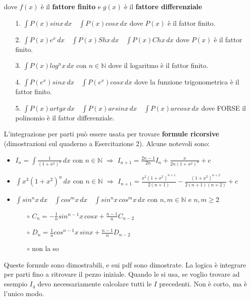 \documentclass{article}
\theoremstyle{definition}
\theoremstyle{definition}
\theoremstyle{definition}
\theoremstyle{definition}
\theoremstyle{definition}
\begin{document}
dove $f(x)$ è il \textbf{fattore finito} e $g(x)$ è il \textbf{fattore differenziale}
\begin{itemize}
    \item [1.] $\displaystyle{\int P(x)sinx\,dx}\quad \displaystyle{\int P(x)cosx\,dx}$ dove $P(x)$ è il fattor finito.
    \item [2.] $\displaystyle{\int P(x)e^x\, dx} \quad \displaystyle{\int P(x)Shx\, dx} \quad \displaystyle{\int P(x)Chx\, dx}$ dove $P(x)$ è il fattor finito.
    \item [3.] $\displaystyle{\int P(x)log^nx\, dx}$ con $n\in\mathbb{N}$ dove il logaritmo è il fattor finito.
    \item [4.] $\displaystyle{\int P(e^x)sinx\,dx} \quad \displaystyle{\int P(e^x)cosx\,dx}$ dove la funzione trigonometrica è il fattor finito.
    \item [5.] $\displaystyle{\int P(x)artgx\, dx} \quad \displaystyle{\int P(x)arsinx\, dx} \quad \displaystyle{\int P(x)arcosx\, dx}$ dove FORSE il polinomio è il fattor differenziale.
\end{itemize}

L'integrazione per parti può essere usata per trovare \textbf{formule ricorsive} (dimostrazioni sul quaderno a Esercitazione 2). Alcune notevoli sono:
\begin{itemize}
    \item $\displaystyle{I_n=\int \frac{1}{(1+x^2)^n}\,dx}$ con $n\in\mathbb{N}$ $\Longrightarrow$ $\displaystyle{I_{n+1}= \frac{2n-1}{2n}I_n+\frac{x}{2n(1+x^2)^n}}+c$
    \item $\displaystyle{\int x^3 (1+x^2)^n\, dx}$ con $n\in\mathbb{N}$ $\Longrightarrow$ $\displaystyle{I_{n+1}=\frac{x^2(1+x^2)^{n+1}}{2(n+1)} - \frac{(1+x^2)^{n+2}}{2(n+1)(n+2)}}+c$
    \item $\displaystyle{\int sin^nx\,dx} \quad \displaystyle{\int cos^mx\,dx} \quad \displaystyle{\int sin^nx\,cos^mx\,dx}$ con $n,m\in\mathbb{N}$ e $n,m \geq 2$
    \begin{itemize}
        \item [$\circ$] $\displaystyle{C_n=-\frac{1}{n}sin^{n-1}x\,cosx+\frac{n-1}{n}C_{n-2}}$ 
        \item [$\circ$] $\displaystyle{D_n=\frac{1}{n}cos^{n-1}x\,sinx+\frac{n-1}{n}D_{n-2}}$
        \item [$\circ$] non la so
    \end{itemize}
\end{itemize}

Queste formule sono dimostrabili, e sui pdf sono dimostrate. La logica è integrare per parti fino a ritrovare il pezzo iniziale. Quando le si usa, se voglio trovare ad esempio $I_4$ devo necessariamente calcolare tutti le $I$ precedenti. Non è corto, ma è l'unico modo.
\end{document}
